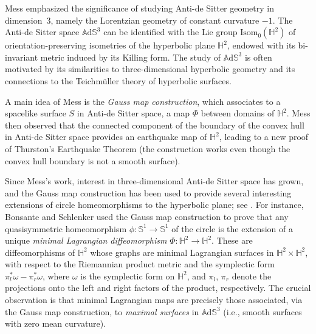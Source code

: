 \documentclass[11pt]{article}
\newcommand{\ie}{i.e.,\xspace}
\theoremstyle{plain}
\theoremstyle{definition}
\newcommand{\ads}{\mathbb{A}\mathrm{d}\mathbb{S}^3}
\begin{document}
Mess emphasized the significance of studying Anti-de Sitter geometry in dimension~$3$, namely the Lorentzian geometry of constant curvature $-1$. The Anti-de Sitter space $\ads$ can be identified with the Lie group \(\text{Isom}_0(\mathbb{H}^2)\) of orientation-preserving isometries of the hyperbolic plane \(\mathbb{H}^2\), endowed with its bi-invariant metric induced by its Killing form. The study of $\ads$ is often motivated by its similarities to three-dimensional hyperbolic geometry and its connections to the Teichmüller theory of hyperbolic surfaces.

A main idea of Mess is the \emph{Gauss map construction}, which associates to a spacelike surface \(S\) in Anti-de Sitter space, a map \(\Phi\) between domains of \(\mathbb{H}^2\). Mess then observed that the connected component of the boundary of the convex hull in Anti-de Sitter space provides an earthquake map of \(\mathbb{H}^2\), leading to a new proof of Thurston's Earthquake Theorem \cite{Thurston} (the construction works even though the convex hull boundary is not a smooth surface).

Since Mess's work, interest in three-dimensional Anti-de Sitter space has grown, and the Gauss map construction has been used to provide several interesting extensions of circle homeomorphisms to the hyperbolic plane; see \cite{Maximalsurface, Areapreserving, SEP19}. For instance, Bonsante and Schlenker used the Gauss map construction to prove that any quasisymmetric homeomorphism \(\phi:\mathbb{S}^1 \to \mathbb{S}^1\) of the circle is the extension of a unique \emph{minimal Lagrangian diffeomorphism} \(\Phi:\mathbb{H}^2 \to \mathbb{H}^2\). These are diffeomorphisms of \(\mathbb{H}^2\) whose graphs are minimal Lagrangian surfaces in \(\mathbb{H}^2 \times \mathbb{H}^2\), with respect to the Riemannian product metric and the symplectic form \(\pi_l^* \omega - \pi_r^* \omega\), where \(\omega\) is the symplectic form on \(\mathbb{H}^2\), and \(\pi_l\), \(\pi_r\) denote the projections onto the left and right factors of the product, respectively.
The crucial observation is that minimal Lagrangian maps are precisely those associated, via the Gauss map construction, to \emph{maximal surfaces} in $\ads$ (\ie smooth surfaces with zero mean curvature).
\end{document}
